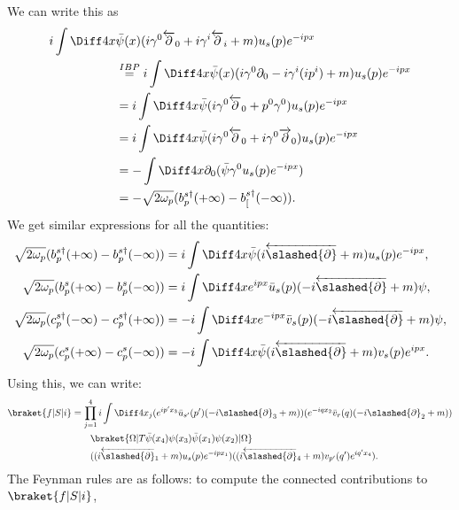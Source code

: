 \documentclass[12pt]{article}
\begin{document}
We can write this as
\begin{align*}
	i \int \Diff 4 x &\bar \psi (x) (i \gamma^0 \overleftarrow \partial_0 + i \gamma^i \overleftarrow \partial_i + m) u_s(p) e^{-ipx} \\
			 &\overset{IBP}= i \int \Diff 4 x \bar \psi(x) (i \gamma^0 \partial_0 - i \gamma^i (i p^i) + m) u_s(p) e^{-ipx} \\
			 &= i \int \Diff 4 x \bar \psi(i \gamma^0 \overleftarrow \partial_0 + p^0 \gamma^0) u_s(p) e^{-ipx} \\
			 &= i \int \Diff 4 x \bar \psi(i \gamma^0 \overleftarrow \partial_0 + i \gamma^0 \overrightarrow \partial_0) u_s(p) e^{-ipx} \\
			 &= - \int \Diff 4 x \partial_0(\bar \psi \gamma^0 u_s(p) e^{-ipx}) \\
			 &= - \sqrt{2 \omega_p}(b_p^{s\dagger}(+\infty) - b_[^{s\dagger}(-\infty)).
\end{align*}
We get similar expressions for all the quantities:
\begin{align*}
	\sqrt{2 \omega_p} (b_p^{s\dagger} (+\infty) - b_p^{s\dagger}(-\infty)) &= i \int \Diff 4 x \bar \psi (i \overleftarrow{\slashed{\partial}} + m) u_s(p) e^{-ipx},\\
	\sqrt{2 \omega_p} (b_p^{s} (+\infty) - b_p^{s}(-\infty)) &= i \int \Diff 4 x e^{ipx} \bar u_s(p) (-i \overleftarrow{\slashed{\partial}} + m) \psi,\\
	\sqrt{2 \omega_p} (c_p^{s\dagger} (-\infty) - c_p^{s\dagger}(+\infty)) &= -i \int \Diff 4 x e^{-ipx} \bar v_s(p) (-i \overleftarrow{\slashed{\partial}} + m) \psi,\\
	\sqrt{2 \omega_p} (c_p^{s} (+\infty) - c_p^{s}(-\infty)) &= -i \int \Diff 4 x \bar \psi (i \overleftarrow{\slashed{\partial}} + m) v_s(p) e^{ipx}.
\end{align*}
Using this, we can write:
\begin{align*}
	\braket{f|S|i} &= \prod_{j = 1}^4 i \int \Diff 4 x_j (e^{ip' x_3} \bar u_{s'}(p') (-i \slashed{\partial}_3 + m)) (e^{-iq x_2} \bar v_{r}(q) (-i \slashed{\partial}_2 + m)) \\
		       &\qquad \braket{\Omega| T \bar \psi(x_4) \psi(x_3) \bar \psi(x_1) \psi(x_2) | \Omega} \\
		       & \qquad ((i \overleftarrow{\slashed{\partial}}_1 + m) u_s(p) e^{-ipx_1}) ((i \overleftarrow{\slashed{\partial}}_4 + m) v_{p'}(q') e^{iq'x_4}).
\end{align*}
The Feynman rules are as follows: to compute the connected contributions to $\braket{f|S|i}$,
\end{document}

